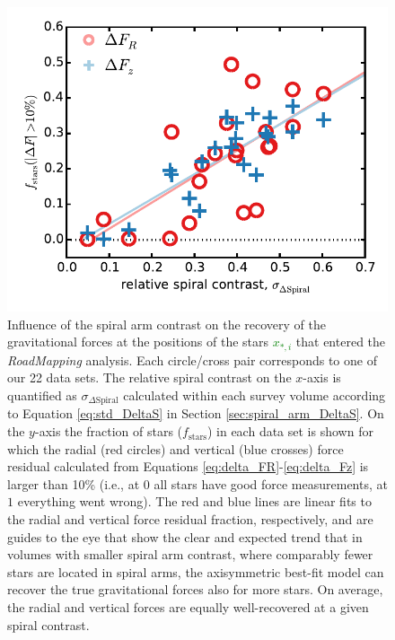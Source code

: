 \documentclass[iop,revtex4,numberedappendix,appendixfloats]{emulateapj}
\newcommand{\RM}{{\sl RoadMapping}}
\newcommand{\NEW}[1]{\textcolor{Green}{#1}}
\newcommand{\OLD}[1]{}
\begin{document}
\begin{figure}[!htbp]
\centering
\includegraphics[width=\columnwidth]{fig/MNdHHdiffSph2_plot_stdkappa_vs_frac10star_3.pdf}
\caption{Influence of the spiral arm contrast on the recovery of the gravitational forces at the positions of the stars \NEW{$x_{*,i}$} that entered the \RM{} analysis. Each circle/cross pair corresponds to one of our 22 data sets. The relative spiral contrast on the $x$-axis is quantified as $\sigma_{\Delta\text{Spiral}} \OLD{\equiv \sigma[\Delta_\text{Spiral}(r\leq r_\text{max})]}$ calculated within each survey volume according to Equation \eqref{eq:std_DeltaS} in Section \ref{sec:spiral_arm_DeltaS}. On the $y$-axis the fraction of stars ($f_\text{stars}$) in each data set is shown for which the radial (red circles) and vertical (blue crosses) force residual calculated from Equations \eqref{eq:delta_FR}-\eqref{eq:delta_Fz} is larger than 10\% (i.e., at $0$ all stars have good force measurements, at $1$ everything went wrong). The red and blue lines are linear fits to the radial and vertical force residual fraction, respectively, and are guides to the eye that show the clear and expected trend that in volumes with smaller spiral arm contrast, where comparably fewer stars are located in spiral arms, the axisymmetric best-fit model can recover the true gravitational forces also for more stars. On average, the radial and vertical forces are equally well-recovered at a given spiral contrast.}
\label{fig:std_DeltaS_vs_frac10_stars}
\end{figure}
\end{document}
